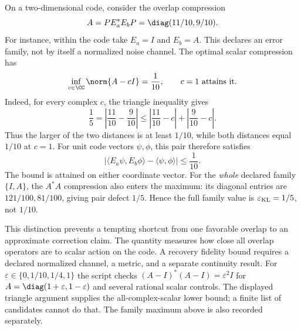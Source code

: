 On a two-dimensional code, consider the overlap compression
\[
A=PE_a^*E_bP=\diag(11/10,9/10).
\]
For instance, within the code take $E_a=I$ and $E_b=A$. This declares an error family, not by itself a normalized noise channel. The optimal scalar compression has
\[
\inf_{c\in\CC}\norm{A-cI}=\frac1{10},\qquad c=1\ \text{attains it}.
\]
Indeed, for every complex $c$, the triangle inequality gives
\[
\frac15=\left|\frac{11}{10}-\frac9{10}\right|
\leq\left|\frac{11}{10}-c\right|+\left|\frac9{10}-c\right|.
\]
Thus the larger of the two distances is at least $1/10$, while both distances equal $1/10$ at $c=1$.
For unit code vectors $\psi,\phi$, this pair therefore satisfies
\[
\left|\langle E_a\psi,E_b\phi\rangle-\langle\psi,\phi\rangle\right|
\leq\frac1{10}.
\]
The bound is attained on either coordinate vector. For the \emph{whole} declared family $\{I,A\}$, the $A^*A$ compression also enters the maximum: its diagonal entries are $121/100,81/100$, giving pair defect $1/5$. Hence the full family value is $\varepsilon_{\rm KL}=1/5$, not $1/10$.

This distinction prevents a tempting shortcut from one favorable overlap to an approximate correction claim. The quantity measures how close all overlap operators are to scalar action on the code. A recovery fidelity bound requires a declared normalized channel, a metric, and a separate continuity result.
For $\varepsilon\in\{0,1/10,1/4,1\}$ the script checks $(A-I)^*(A-I)=\varepsilon^2I$ for $A=\diag(1+\varepsilon,1-\varepsilon)$ and several rational scalar controls. The displayed triangle argument supplies the all-complex-scalar lower bound; a finite list of candidates cannot do that. The family maximum above is also recorded separately.

